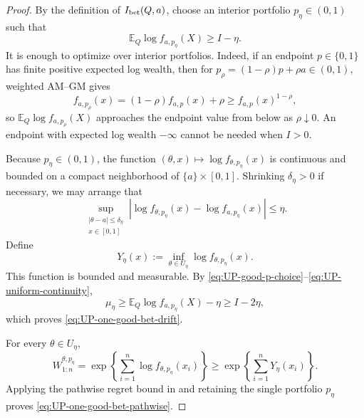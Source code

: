 \documentclass[12pt]{article}
\theoremstyle{spaced}
\theoremstyle{remark}
\newcommand{\E}{\mathbb E}
\begin{document}
\begin{proof}
By the definition of $I_{\rm bet}(Q,a)$, choose an interior portfolio
$p_\eta\in(0,1)$ such that
\begin{equation}
\label{eq:UP-good-p-choice}
 \E_Q\log f_{a,p_\eta}(X)\ge I-\eta.
\end{equation}
It is enough to optimize over interior portfolios.  Indeed, if an endpoint
$p\in\{0,1\}$ has finite positive expected log wealth, then for
$p_\rho=(1-\rho)p+\rho a\in(0,1)$, weighted AM--GM gives
\[
 f_{a,p_\rho}(x)
 =(1-\rho)f_{a,p}(x)+\rho
 \ge f_{a,p}(x)^{1-\rho},
\]
so $\E_Q\log f_{a,p_\rho}(X)$ approaches the endpoint value from below as
$\rho\downarrow0$.  An endpoint with expected log wealth $-\infty$ cannot be
needed when $I>0$.

Because $p_\eta\in(0,1)$, the function
$(\theta,x)\mapsto\log f_{\theta,p_\eta}(x)$ is continuous and bounded on a
compact neighborhood of $\{a\}\times[0,1]$.  Shrinking
$\delta_\eta>0$ if necessary, we may arrange that
\begin{equation}
\label{eq:UP-uniform-continuity}
 \sup_{\substack{|\theta-a|\le\delta_\eta\\x\in[0,1]}}
 \left|
   \log f_{\theta,p_\eta}(x)-\log f_{a,p_\eta}(x)
 \right|
 \le\eta.
\end{equation}
Define
\[
 Y_\eta(x):=
 \inf_{\theta\in U_\eta}\log f_{\theta,p_\eta}(x).
\]
This function is bounded and measurable.  By
\eqref{eq:UP-good-p-choice}--\eqref{eq:UP-uniform-continuity},
\[
 \mu_\eta
 \ge \E_Q\log f_{a,p_\eta}(X)-\eta
 \ge I-2\eta,
\]
which proves \eqref{eq:UP-one-good-bet-drift}.

For every $\theta\in U_\eta$,
\[
 W_{1:n}^{\theta,p_\eta}
 =\exp\left\{\sum_{i=1}^n
       \log f_{\theta,p_\eta}(x_i)\right\}
 \ge\exp\left\{\sum_{i=1}^nY_\eta(x_i)\right\}.
\]
Applying the pathwise regret bound in
 and retaining the single portfolio
$p_\eta$ proves \eqref{eq:UP-one-good-bet-pathwise}.
\end{proof}
\end{document}
